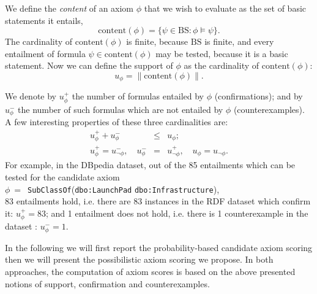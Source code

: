 \documentclass[conference]{IEEEtran}
\begin{document}
We define the \emph{content} of an axiom $\phi$ that we wish to evaluate
as the set of basic statements it entails,
\begin{equation}\label{eq:content}
  \mathrm{content}(\phi) = \{\psi \in \mathrm{BS}: \phi \models \psi\}.
\end{equation}
The cardinality of $\mathrm{content}(\phi)$ is finite, because $\mathrm{BS}$ is finite,
and every entailment of formula $\psi \in \mathrm{content}(\phi)$ may be tested, because it is a basic statement.
Now we can define the support of $\phi$ as the cardinality of $\mathrm{content}(\phi)$:
\begin{equation}\label{eq:content2}
    u_\phi = \|\mathrm{content}(\phi)\|.
\end{equation}

We denote by $u_\phi^+$ the number of formulas entailed by $\phi$ (confirmations); and
by $u_\phi^-$ the number of such formulas which are not entailed by $\phi$ (counterexamples).
A few interesting properties of these three cardinalities are:
\begin{eqnarray}
  u_\phi^+ + u_\phi^- &\leq& u_\phi;\label{eq:conf-pls-expt-lt-refc} \\
  u_\phi^+ = u_{\neg\phi}^-, \quad
  u_\phi^- &=& u_{\neg\phi}^+, \quad
  u_\phi = u_{\neg\phi}.
\end{eqnarray}
For example, in the DBpedia dataset, out of the 85 entailments which can be tested for the candidate axiom\\
\small
$\phi~=$~\texttt{SubClassOf}(\texttt{dbo:LaunchPad} \texttt{dbo:Infrastructure}),\\
\normalsize
83 entailments hold, i.e. there are 83 instances in the RDF dataset which confirm it: $u_\phi^+ = 83$; 
and 1 entailment does not hold, i.e. there is 1 counterexample in the dataset
: $u_\phi^- = 1$.

In the following we will first report the probability-based candidate axiom scoring then we will present the possibilistic axiom scoring we propose. In both approaches, the computation of axiom scores is based on the above presented notions of support, confirmation and counterexamples. 
\end{document}
